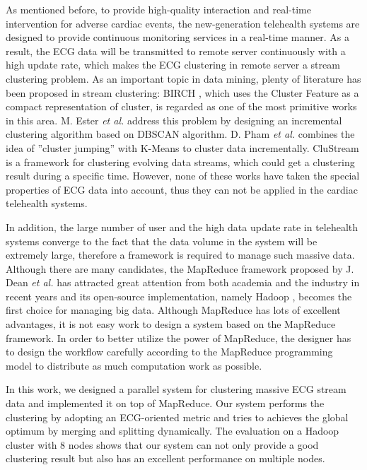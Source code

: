 \documentclass[conference]{IEEEtran}
\begin{document}
As mentioned before, to provide high-quality interaction and real-time intervention for adverse cardiac events, the new-generation telehealth systems are designed to provide continuous monitoring services in a real-time manner. As a result, the ECG data will be transmitted to remote server continuously with a high update rate, which makes the ECG clustering in remote server a stream clustering problem. As an important topic in data mining, plenty of literature has been proposed in stream clustering: BIRCH \cite{Zhang:1996:BED:235968.233324}, which uses the Cluster Feature as a compact representation of cluster, is regarded as one of the most primitive works in this area. M. Ester \textit{et al.} \cite{Ester:1998:ICM:645924.671201} address this problem by designing an incremental clustering algorithm based on DBSCAN algorithm. D. Pham \textit{et al.} \cite{pham2004incremental} combines the idea of ''cluster jumping'' with K-Means to cluster data incrementally. CluStream \cite{aggarwal2003framework} is a framework for clustering evolving data streams, which could get a clustering result during a specific time. However, none of these works have taken the special properties of ECG data into account, thus they can not be applied in the cardiac telehealth systems. 


In addition, the large number of user and the high data update rate in telehealth systems converge to the fact that the data volume in the system will be extremely large, therefore a framework is required to manage such massive data. Although there are many candidates, the MapReduce framework  proposed by J. Dean \textit{et al.} \cite{dean2008mapreduce} has attracted great attention from both academia and the industry in recent years and its open-source implementation, namely Hadoop \cite{white2010hadoop}, becomes the first choice for managing big data. Although MapReduce has lots of excellent advantages, it is not easy work to design a system based on the MapReduce framework. In order to better utilize the power of MapReduce, the designer has to design the workflow carefully according to the MapReduce programming model to distribute as much computation work as possible.


In this work, we designed a parallel system for clustering massive ECG stream data and implemented it on top of MapReduce. Our system performs the clustering by adopting an ECG-oriented metric and tries to achieves the global optimum by merging and splitting dynamically. The evaluation on a Hadoop cluster with 8 nodes shows that our system can not only provide a good clustering result but also has an excellent performance on multiple nodes.
\end{document}
